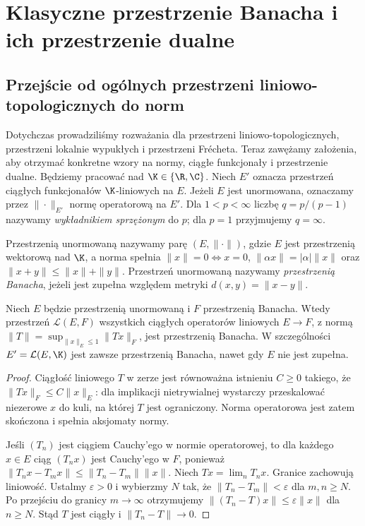 \setcounter{section}{11}
\section{Klasyczne przestrzenie Banacha i ich przestrzenie dualne}
\label{sec:klasyczne-banach12}

\subsection{Przejście od ogólnych przestrzeni liniowo-topologicznych do norm}

Dotychczas prowadziliśmy rozważania dla przestrzeni liniowo-topologicznych,
przestrzeni lokalnie wypukłych i przestrzeni Frécheta. Teraz zawężamy
założenia, aby otrzymać konkretne wzory na normy, ciągłe funkcjonały
i przestrzenie dualne. Będziemy pracować nad $\K\in\{\R,\C\}$.
Niech $E'$ oznacza przestrzeń ciągłych funkcjonałów $\K$-liniowych na $E$.
Jeżeli $E$ jest unormowana, oznaczamy przez $\|\cdot\|_{E'}$ normę
operatorową na $E'$. Dla $1<p<\infty$ liczbę $q=p/(p-1)$ nazywamy
\emph{wykładnikiem sprzężonym} do $p$; dla $p=1$ przyjmujemy $q=\infty$.

\begin{definicja}
\label{def:banach12}
Przestrzenią unormowaną nazywamy parę $(E,\|\cdot\|)$, gdzie $E$
jest przestrzenią wektorową nad $\K$, a norma spełnia
$\|x\|=0\iff x=0$, $\|\alpha x\|=|\alpha|\|x\|$ oraz
$\|x+y\|\le\|x\|+\|y\|$. Przestrzeń unormowaną nazywamy
\emph{przestrzenią Banacha}, jeżeli jest zupełna względem metryki
$d(x,y)=\|x-y\|$.
\end{definicja}

\begin{stwierdzenie}
\label{prop:operator-norm12}
Niech $E$ będzie przestrzenią unormowaną i $F$ przestrzenią Banacha.
Wtedy przestrzeń $\mathcal L(E,F)$ wszystkich ciągłych operatorów
liniowych $E\to F$, z normą
$\|T\|=\sup_{\|x\|_E\le1}\|Tx\|_F$, jest przestrzenią Banacha.
W szczególności $E'=\mathcal L(E,\K)$ jest zawsze przestrzenią
Banacha, nawet gdy $E$ nie jest zupełna.
\end{stwierdzenie}
\begin{proof}
Ciągłość liniowego $T$ w zerze jest równoważna istnieniu $C\ge0$
takiego, że $\|Tx\|_F\le C\|x\|_E$: dla implikacji nietrywialnej
wystarczy przeskalować niezerowe $x$ do kuli, na której $T$ jest
ograniczony. Norma operatorowa jest zatem skończona i spełnia
aksjomaty normy.

Jeśli $(T_n)$ jest ciągiem Cauchy'ego w normie operatorowej,
to dla każdego $x\in E$ ciąg $(T_nx)$ jest Cauchy'ego w $F$, ponieważ
$\|T_nx-T_mx\|\le\|T_n-T_m\|\|x\|$.
Niech $Tx=\lim_nT_nx$. Granice zachowują liniowość. Ustalmy
$\varepsilon>0$ i wybierzmy $N$ tak, że
$\|T_n-T_m\|<\varepsilon$ dla $m,n\ge N$.
Po przejściu do granicy $m\to\infty$ otrzymujemy
$\|(T_n-T)x\|\le\varepsilon\|x\|$ dla $n\ge N$.
Stąd $T$ jest ciągły i $\|T_n-T\|\to0$.
\end{proof}

